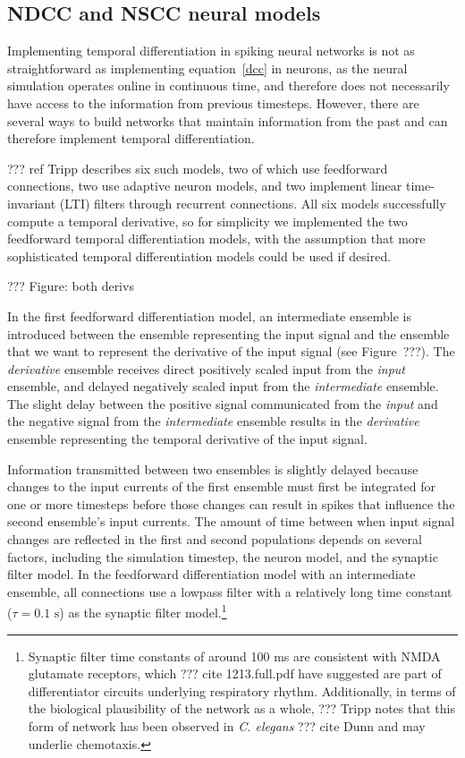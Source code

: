 \subsection{NDCC and NSCC neural models}

Implementing temporal differentiation
in spiking neural networks
is not as straightforward as implementing
equation~\eqref{dcc} in neurons,
as the neural simulation operates
online in continuous time,
and therefore does not necessarily
have access to the information
from previous timesteps.
However, there are several ways
to build networks that maintain
information from the past
and can therefore implement temporal differentiation.

??? ref Tripp describes six such models,
two of which use feedforward connections,
two use adaptive neuron models,
and two implement linear time-invariant (LTI) filters
through recurrent connections.
All six models successfully
compute a temporal derivative,
so for simplicity we implemented
the two feedforward temporal differentiation models,
with the assumption that
more sophisticated temporal differentiation
models could be used if desired.

??? Figure: both derivs

In the first feedforward differentiation model,
an intermediate ensemble is introduced
between the ensemble representing the input signal
and the ensemble that we want to represent
the derivative of the input signal
(see Figure~???).
The \textit{derivative} ensemble
receives direct positively scaled input from
the \textit{input} ensemble,
and delayed negatively scaled input from
the \textit{intermediate} ensemble.
The slight delay between the positive signal
communicated from the \textit{input}
and the negative signal
from the \textit{intermediate} ensemble
results in the \textit{derivative} ensemble
representing the temporal derivative
of the input signal.

Information transmitted between two ensembles
is slightly delayed
because changes to the input currents
of the first ensemble
must first be integrated for one or more
timesteps before those changes can result in
spikes that influence
the second ensemble's input currents.
The amount of time between
when input signal changes are reflected
in the first and second populations
depends on several factors,
including the simulation timestep,
the neuron model, and the synaptic filter model.
In the feedforward differentiation model
with an intermediate ensemble,
all connections use a lowpass filter
with a relatively long time constant
($\tau=0.1 \text{ s}$)
as the synaptic filter model.\footnote{
  Synaptic filter time constants of around 100 ms
  are consistent with NMDA glutamate receptors,
  which ??? cite 1213.full.pdf have suggested
  are part of differentiator circuits
  underlying respiratory rhythm.
  Additionally, in terms of
  the biological plausibility of the network as a whole,
  ??? Tripp notes that this form of network
  has been observed in \textit{C. elegans} ??? cite Dunn
  and may underlie chemotaxis.}


